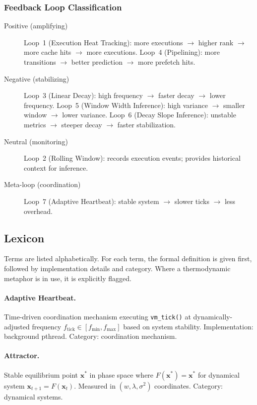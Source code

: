 \subsubsection{Feedback Loop Classification}

\begin{description}
  \item[Positive (amplifying)] Loop~1 (Execution Heat Tracking): more
    executions $\to$ higher rank $\to$ more cache hits $\to$ more executions.
    Loop~4 (Pipelining): more transitions $\to$ better prediction $\to$ more
    prefetch hits.

  \item[Negative (stabilizing)] Loop~3 (Linear Decay): high frequency
    $\to$ faster decay $\to$ lower frequency. Loop~5 (Window Width
    Inference): high variance $\to$ smaller window $\to$ lower variance.
    Loop~6 (Decay Slope Inference): unstable metrics $\to$ steeper decay
    $\to$ faster stabilization.

  \item[Neutral (monitoring)] Loop~2 (Rolling Window): records execution
    events; provides historical context for inference.

  \item[Meta-loop (coordination)] Loop~7 (Adaptive Heartbeat): stable
    system $\to$ slower ticks $\to$ less overhead.
\end{description}

\subsection{Lexicon}

Terms are listed alphabetically. For each term, the formal definition is
given first, followed by implementation details and category. Where a
thermodynamic metaphor is in use, it is explicitly flagged.

\paragraph{Adaptive Heartbeat.}
Time-driven coordination mechanism executing \texttt{vm\_tick()} at
dynamically-adjusted frequency $f_{\text{tick}} \in [f_{\min}, f_{\max}]$
based on system stability. Implementation: background pthread.
Category: coordination mechanism.

\paragraph{Attractor.}
Stable equilibrium point $\mathbf{x}^*$ in phase space where
$F(\mathbf{x}^*) = \mathbf{x}^*$ for dynamical system
$\mathbf{x}_{t+1} = F(\mathbf{x}_t)$. Measured in
$(w, \lambda, \sigma^2)$ coordinates. Category: dynamical systems.

